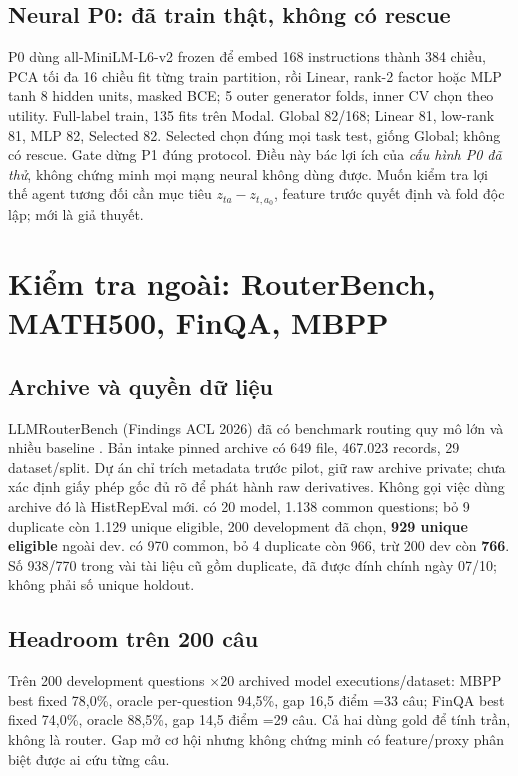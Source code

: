\documentclass[11pt,a4paper,openany]{book}
\newcommand{\repo}[1]{\path{#1}}
\begin{document}
\section{Neural P0: đã train thật, không có rescue}
P0 dùng all-MiniLM-L6-v2 frozen để embed 168 instructions thành 384 chiều, PCA tối đa 16 chiều fit từng train partition, rồi Linear, rank-2 factor hoặc MLP tanh 8 hidden units, masked BCE; 5 outer generator folds, inner CV chọn theo utility. Full-label train, 135 fits trên Modal. Global 82/168; Linear 81, low-rank 81, MLP 82, Selected 82. Selected chọn đúng \repo{react_gpt4o} mọi task test, giống Global; không có rescue. Gate dừng P1 đúng protocol. Điều này bác lợi ích của \emph{cấu hình P0 đã thử}, không chứng minh mọi mạng neural không dùng được. Muốn kiểm tra lợi thế agent tương đối cần mục tiêu \(z_{ta}-z_{t,a_0}\), feature trước quyết định và fold độc lập; mới là giả thuyết.

\chapter{Kiểm tra ngoài: RouterBench, MATH500, FinQA, MBPP}
\section{Archive và quyền dữ liệu}
LLMRouterBench (Findings ACL 2026) đã có benchmark routing quy mô lớn và nhiều baseline \cite{llmrouterbench}. Bản intake pinned archive có 649 file, 467.023 records, 29 dataset/split. Dự án chỉ trích metadata trước pilot, giữ raw archive private; chưa xác định giấy phép gốc đủ rõ để phát hành raw derivatives. Không gọi việc dùng archive đó là HistRepEval mới. \repo{finqa/test} có 20 model, 1.138 common questions; bỏ 9 duplicate còn 1.129 unique eligible, 200 development đã chọn, \textbf{929 unique eligible} ngoài dev. \repo{mbpp/test} có 970 common, bỏ 4 duplicate còn 966, trừ 200 dev còn \textbf{766}. Số 938/770 trong vài tài liệu cũ gồm duplicate, đã được đính chính ngày 07/10; không phải số unique holdout.

\section{Headroom trên 200 câu}\label{sec:headroom}
Trên 200 development questions \(\times\)20 archived model executions/dataset: MBPP best fixed 78,0\%, oracle per-question 94,5\%, gap 16,5 điểm =33 câu; FinQA best fixed 74,0\%, oracle 88,5\%, gap 14,5 điểm =29 câu. Cả hai dùng gold để tính trần, không là router. Gap mở cơ hội nhưng không chứng minh có feature/proxy phân biệt được ai cứu từng câu.
\end{document}
